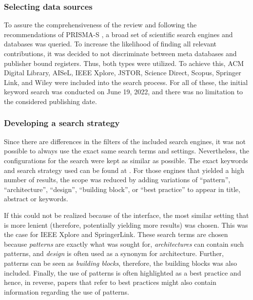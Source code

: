 \documentclass[conference]{IEEEtran}
\begin{document}
\subsubsection{Selecting data sources}

To assure the comprehensiveness of the review and following the recommendations of PRISMA-S \cite{rethlefsen2021prisma}, a broad set of scientific search engines and databases was queried. To increase the likelihood of finding all relevant contributions, it was decided to not discriminate between meta databases and publisher bound registers. Thus, both types were utilized. To achieve this, ACM Digital Library, AISeL, IEEE Xplore, JSTOR, Science Direct, Scopus, Springer Link, and Wiley were included into the search process. For all of these, the initial keyword search was conducted on June 19, 2022, and there was no limitation to the considered publishing date.

\subsubsection{Developing a search strategy}

Since there are differences in the filters of the included search engines, it was not possible to always use the exact same search terms and settings. Nevertheless, the configurations for the search were kept as similar as possible. The exact keywords and search strategy used can be found at \cite{SLRsearchTerms}. For those engines that yielded a high number of results, the scope was reduced by adding variations of “pattern”, “architecture”, “design”, “building block”, or “best practice” to appear in title, abstract or keywords.



 If this could not be realized because of the interface, the most similar setting that is more lenient (therefore, potentially yielding more results) was chosen. This was the case for IEEE Xplore and SpringerLink. These search terms are chosen because \emph{patterns} are exactly what was sought for, \emph{architectures} can contain such patterns, and \emph{design} is often used as a synonym for architecture. Further, patterns can be seen as \emph{building blocks}, therefore, the building blocks was also included. Finally, the use of patterns is often highlighted as a best practice and hence, in reverse, papers that refer to best practices might also contain information regarding the use of patterns. 
\end{document}

